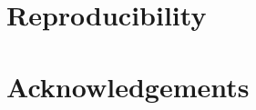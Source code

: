 \documentclass[11pt,a4paper]{article}
\theoremstyle{reproduction}
\begin{document}


\section{Reproducibility}
\label{sec:repro}



\clearpage
\section*{Acknowledgements}



\clearpage
\printbibliography
\end{document}
